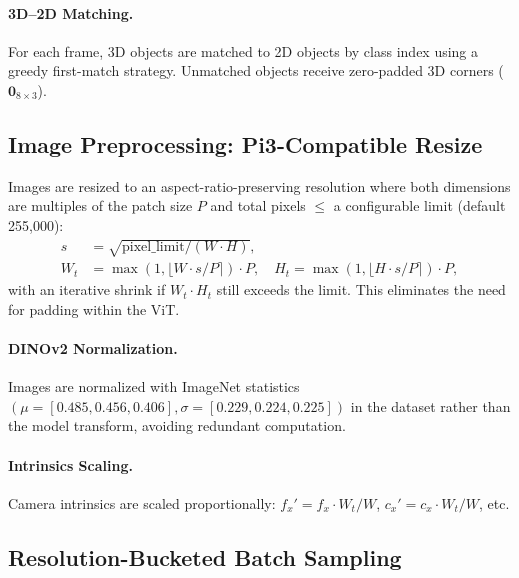 \documentclass[runningheads]{llncs}
\newcommand{\mat}[1]{\bm{#1}}
\begin{document}
\paragraph{3D--2D Matching.}  For each frame, 3D objects are matched to 2D objects by class index using a greedy first-match strategy.  Unmatched objects receive zero-padded 3D corners ($\mat{0}_{8 \times 3}$).

\subsection{Image Preprocessing: Pi3-Compatible Resize}
\label{sec:pi3_resize}

Images are resized to an aspect-ratio-preserving resolution where both dimensions are multiples of the patch size $P$ and total pixels $\leq$ a configurable limit (default 255,000):
\begin{align}
    s &= \sqrt{\text{pixel\_limit} / (W \cdot H)}, \label{eq:scale} \\
    W_t &= \max(1, \lfloor W \cdot s / P \rceil) \cdot P, \quad H_t = \max(1, \lfloor H \cdot s / P \rceil) \cdot P, \label{eq:target_dims}
\end{align}
with an iterative shrink if $W_t \cdot H_t$ still exceeds the limit.  This eliminates the need for padding within the ViT.

\paragraph{DINOv2 Normalization.}  Images are normalized with ImageNet statistics $(\mu = [0.485, 0.456, 0.406], \sigma = [0.229, 0.224, 0.225])$ in the dataset rather than the model transform, avoiding redundant computation.

\paragraph{Intrinsics Scaling.}  Camera intrinsics are scaled proportionally: $f_x' = f_x \cdot W_t / W$, $c_x' = c_x \cdot W_t / W$, etc.

\subsection{Resolution-Bucketed Batch Sampling}
\label{sec:bucketing}
\end{document}
